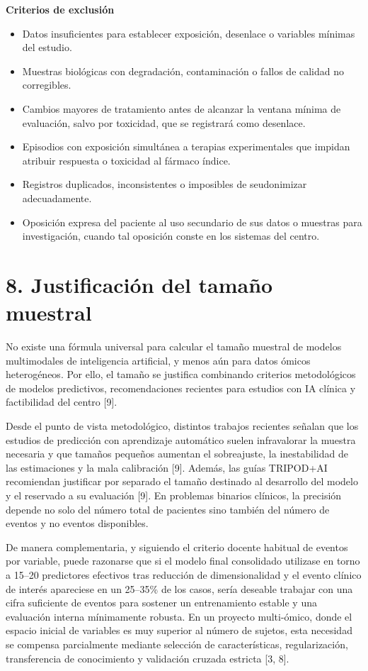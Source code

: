 \documentclass[11pt,a4paper]{article}
\begin{document}
\textbf{Criterios de exclusión}
\begin{itemize}
    \item Datos insuficientes para establecer exposición, desenlace o variables
    mínimas del estudio.
    \item Muestras biológicas con degradación, contaminación o fallos de calidad
    no corregibles.
    \item Cambios mayores de tratamiento antes de alcanzar la ventana mínima de
    evaluación, salvo por toxicidad, que se registrará como desenlace.
    \item Episodios con exposición simultánea a terapias experimentales que
    impidan atribuir respuesta o toxicidad al fármaco índice.
    \item Registros duplicados, inconsistentes o imposibles de seudonimizar
    adecuadamente.
    \item Oposición expresa del paciente al uso secundario de sus datos o
    muestras para investigación, cuando tal oposición conste en los sistemas del
    centro.
\end{itemize}


\section*{8. Justificación del tamaño muestral}
No existe una fórmula universal para calcular el tamaño muestral de modelos
multimodales de inteligencia artificial, y menos aún para datos ómicos
heterogéneos. Por ello, el tamaño se justifica combinando criterios
metodológicos de modelos predictivos, recomendaciones recientes para estudios
con IA clínica y factibilidad del centro [9].

Desde el punto de vista metodológico, distintos trabajos recientes señalan que
los estudios de predicción con aprendizaje automático suelen infravalorar la
muestra necesaria y que tamaños pequeños aumentan el sobreajuste, la
inestabilidad de las estimaciones y la mala calibración [9]. Además, las guías
TRIPOD+AI recomiendan justificar por separado el tamaño destinado al desarrollo
del modelo y el reservado a su evaluación [9]. En problemas binarios clínicos,
la precisión depende no solo del número total de pacientes sino también del
número de eventos y no eventos disponibles.

De manera complementaria, y siguiendo el criterio docente habitual de eventos
por variable, puede razonarse que si el modelo final consolidado utilizase en
torno a 15--20 predictores efectivos tras reducción de dimensionalidad y el
evento clínico de interés apareciese en un 25--35\% de los casos, sería
deseable trabajar con una cifra suficiente de eventos para sostener un
entrenamiento estable y una evaluación interna mínimamente robusta. En un
proyecto multi-ómico, donde el espacio inicial de variables es muy superior al
número de sujetos, esta necesidad se compensa parcialmente mediante selección de
características, regularización, transferencia de conocimiento y validación
cruzada estricta [3, 8].
\end{document}
